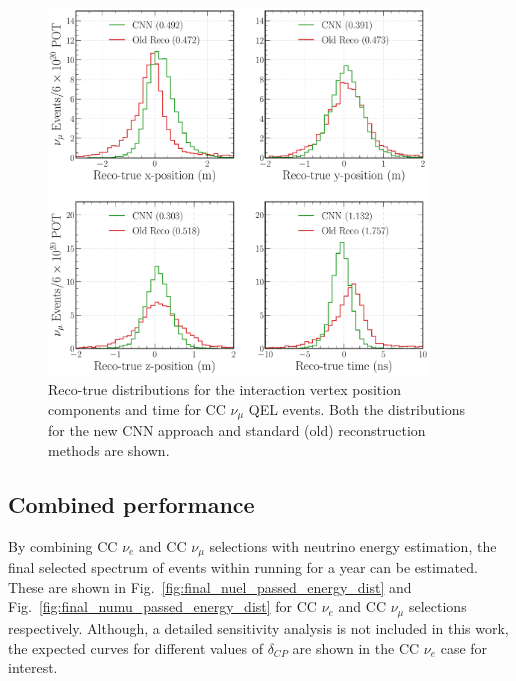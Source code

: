 \begin{figure} %
    \includegraphics[width=0.9\textwidth]{diagrams/7-results/final_vertex_numu_res_comparison.pdf}
    \caption[Reco-true distributions for the interaction vertex parameters for CC $\nu_{\mu}$ QEL
        events] {Reco-true distributions for the interaction vertex position components and time
        for CC $\nu_{\mu}$ QEL events. Both the distributions for the new CNN approach and
        standard (old) reconstruction methods are shown.}
    \label{fig:final_vertex_numu_res_comparison}
\end{figure}

\subsection{Combined performance} %
\label{sec:results_eval_combined} %

By combining CC $\nu_{e}$ and CC $\nu_{\mu}$ selections with neutrino energy estimation, the final
selected spectrum of events within \chipsfive running for a year can be estimated. These are shown
in Fig.~\ref{fig:final_nuel_passed_energy_dist} and Fig.~\ref{fig:final_numu_passed_energy_dist}
for CC $\nu_{e}$ and CC $\nu_{\mu}$ selections respectively. Although, a detailed \chipsfive
sensitivity analysis is not included in this work, the expected curves for different values of
$\delta_{CP}$ are shown in the CC $\nu_{e}$ case for interest.

